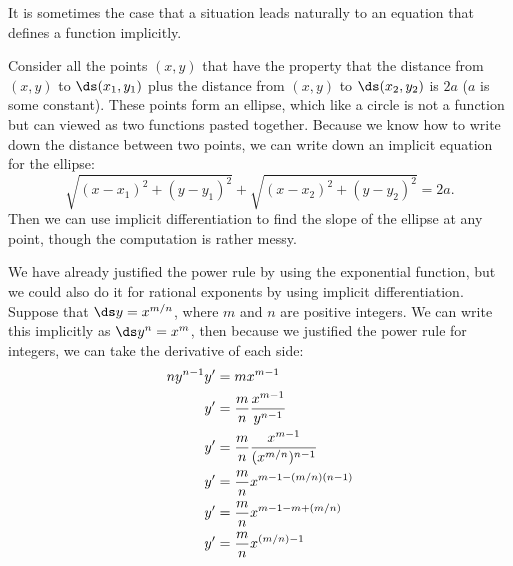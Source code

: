 It is sometimes the case that a situation leads naturally to an
equation that defines a function implicitly. 

\begin{example} Consider all the points $(x,y)$ that have the property that 
the distance from $(x,y)$ to $\ds (x_1,y_1)$ plus the distance 
from $(x,y)$ to $\ds (x_2,y_2)$ is $2a$ ($a$ is some constant). These
points form an ellipse, which like a circle is not a function but can
viewed as two functions pasted together. Because we know how to write
down the distance between two points, we can write down an implicit
equation for the ellipse:
$$\sqrt{(x-x_1)^2+(y-y_1)^2}+\sqrt{(x-x_2)^2+(y-y_2)^2}=2a.$$
Then we can use implicit differentiation to find the slope of the
ellipse at any point, though the computation is rather messy.
\label{example:ellipse}
\end{example}

\begin{example} We have already justified the power rule by
using the exponential function, but we could also do it for rational
exponents by using implicit differentiation.  Suppose that
$\ds y=x^{m/n}$, where $m$ and $n$ are positive integers. We can write
this implicitly as $\ds y^n=x^m$, then because we justified the power rule
for integers, we can take the derivative of each side:
\begin{align*}
ny^{n-1}y' &= mx^{m-1} \\
y'&= {m\over n}{x^{m-1}\over y^{n-1}} \\
y'&= {m\over n}{x^{m-1}\over (x^{m/n})^{n-1}} \\
y'&= {m\over n}x^{m-1-(m/n)(n-1)} \\
y'&= {m\over n}x^{m-1-m+(m/n)} \\
y'&= {m\over n}x^{(m/n)-1} \\
\end{align*}
\end{example}

